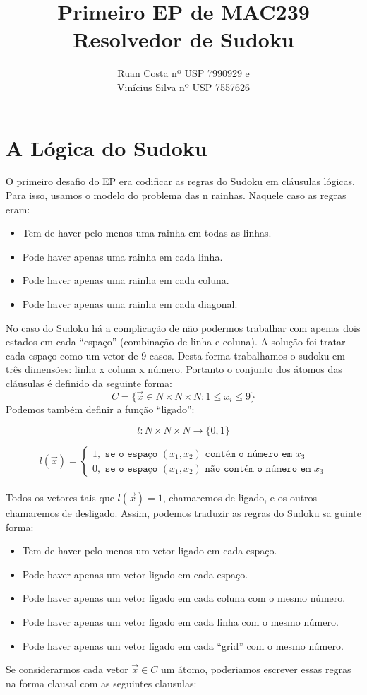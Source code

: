 \documentclass[
	article,			
	11pt,				
	oneside,			
	a4paper,			
	english,			
	brazil,				
	]{abntex2}
\author{Ruan Costa  nº USP 7990929 e \\ Vinícius Silva nº USP 7557626}
\title{Primeiro EP de MAC239 \\ Resolvedor de Sudoku}
\begin{document}
\maketitle
\tableofcontents
\section{A Lógica do Sudoku}
O primeiro desafio do EP era codificar as regras do Sudoku em cláusulas lógicas. 
Para isso, usamos o modelo do problema das n rainhas.
Naquele caso as regras eram:
\begin{itemize}
\item Tem de haver pelo menos uma rainha em todas as linhas.
\item Pode haver apenas uma rainha em cada linha.
\item Pode haver apenas uma rainha em cada coluna.
\item Pode haver apenas uma rainha em cada diagonal.
\end{itemize}
No caso do Sudoku há a complicação de não podermos trabalhar com apenas dois estados em cada  ``espaço'' (combinação de linha e coluna).
A solução foi tratar cada espaço como um vetor de 9 casos.
Desta forma trabalhamos o sudoku em três dimensões: linha x coluna x número.
Portanto o conjunto dos átomos das cláusulas é definido da seguinte forma:
\begin{displaymath}
C = \{\vec{x} \in N \times N \times N : 1 \leq x_i \leq 9\}
\end{displaymath}
Podemos também definir a função ``ligado'':

\begin{displaymath}
l:N \times N \times N\longrightarrow\{0,1\}
\end{displaymath}

\begin{displaymath}
l(\vec{x}) = 
\begin{cases}
1, \texttt{ se o espaço $(x_1,x_2)$ contém o número em $x_3$}\\
0, \texttt{ se o espaço $(x_1,x_2)$ não contém o número em $x_3$}
\end{cases}
\end{displaymath}
\\
Todos os vetores tais que $l(\vec{x}) = 1$, chamaremos de ligado, e os outros chamaremos de desligado.
Assim, podemos traduzir as regras do Sudoku sa guinte forma:

\begin{itemize}
\item Tem de haver pelo menos um vetor ligado em cada espaço.
\item Pode haver apenas um vetor ligado em cada espaço.
\item Pode haver apenas um vetor ligado em cada coluna com o mesmo número.
\item Pode haver apenas um vetor ligado em cada linha com o mesmo número.
\item Pode haver apenas um vetor ligado em cada ``grid'' com o mesmo número.
\end{itemize}
Se considerarmos cada vetor $\vec{x} \in C$ um átomo, poderiamos escrever essas regras na forma clausal com as seguintes clausulas:
\end{document}
